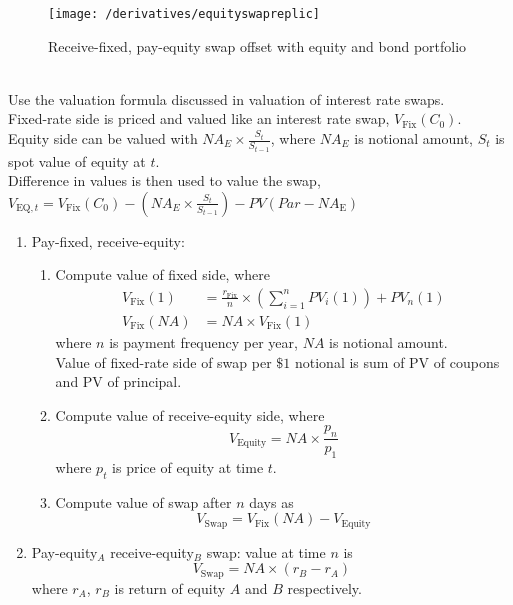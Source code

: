 \begin{figure}[H]
\centering
\texttt{[image: /derivatives/equityswapreplic]}
\caption{Receive-fixed, pay-equity swap offset with equity and bond portfolio}
\end{figure}

\begin{method} \\
Use the valuation formula discussed in valuation of interest rate swaps.\\
Fixed-rate side is priced and valued like an interest rate swap, $V_{\text{Fix}}(C_0)$.\\
Equity side can be valued with $NA_E \times \frac{S_{t}}{S_{t-1}}$, where $NA_E$ is notional amount, $S_t$ is spot value of equity at $t$.\\
Difference in values is then used to value the swap, $V_{\text{EQ},t} = V_{\text{Fix}}(C_0) - (NA_E \times \frac{S_{t}}{S_{t-1}}) - PV(Par-NA_{\text{E}})$
\end{method}

\begin{method} 
\begin{enumerate}[label=\roman*.]
\setlength{\itemsep}{0pt}
\item Pay-fixed, receive-equity:
\begin{enumerate}[label=\arabic*.]
\setlength{\itemsep}{0pt}
\item Compute value of fixed side, where
\begin{align}
V_{\text{Fix}}(1) &= \frac{r_{\text{Fix}}}{n} \times \left( \sum\limits_{i=1}^n PV_{i}(1)\right) + PV_{n}(1) \nonumber \\
V_{\text{Fix}}(NA) &= NA \times V_\text{Fix}(1) \nonumber
\end{align}
where $n$ is payment frequency per year, $NA$ is notional amount.\\
Value of fixed-rate side of swap per $\$1$ notional is sum of PV of coupons and PV of principal.
\item Compute value of receive-equity side, where
\begin{equation}
V_{\text{Equity}} = NA \times \frac{p_n}{p_1} \nonumber
\end{equation}
where $p_t$ is price of equity at time $t$.
\item Compute value of swap after $n$ days as
\begin{equation}
V_{\text{Swap}} = V_{\text{Fix}}(NA) - V_{\text{Equity}} \nonumber
\end{equation}
\end{enumerate}
\item Pay-equity$_A$ receive-equity$_B$ swap: value at time $n$ is
\begin{equation}
V_{\text{Swap}} = NA \times (r_B - r_A) \nonumber
\end{equation}
where $r_A$, $r_B$ is return of equity $A$ and $B$ respectively. 
\end{enumerate}
\end{method}

